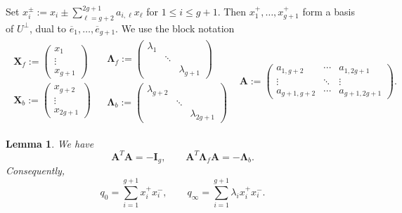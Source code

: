 \documentclass[12pt, letterpaper]{amsart}
\newtheorem{lemma}[theorem]{Lemma}
\theoremstyle{definition}
\newcommand{\bA}{\mathbf{A} }
\newcommand{\bI}{\mathbf{I} }
\newcommand{\bX}{\mathbf{X} }
\newcommand{\lbd}{\lambda}
\begin{document}
Set \(x_i^\pm:=x_i\pm\sum_{\ell=g+2}^{2g+1}a_{i,\ell}x_\ell\) for \(1\le i\le g+1\). Then \(x_1^+,\dots,x_{g+1}^+\) form a basis of \(U^\perp\), dual to \(\overline e_1,\dots,\overline e_{g+1}\). We use the block notation
\[
\begin{matrix}
  \begin{matrix}
  \bX_f:=\left(\begin{smallmatrix}
  x_1\\
  \vdots\\
  x_{g+1}
  \end{smallmatrix}\right) \\[6pt]
  \bX_b:=\left(\begin{smallmatrix}
  x_{g+2}\\
  \vdots\\
  x_{2g+1}
  \end{smallmatrix}\right)
  \end{matrix} & \begin{matrix}
  \mathbf\Lambda_f:=\left(\begin{smallmatrix}
  \lbd_1\\
  &\ddots\\
  &&\lbd_{g+1}
  \end{smallmatrix}\right) \\[6pt]
  \mathbf\Lambda_b:=\left(\begin{smallmatrix}
  \lbd_{g+2}\\
  &\ddots\\
  &&\lbd_{2g+1}
  \end{smallmatrix}\right)
  \end{matrix} & \bA:= \begin{pmatrix}
  a_{1,g+2}&\cdots&a_{1,2g+1}\\
  \vdots&\ddots&\vdots\\
  a_{g+1,g+2}&\cdots&a_{g+1,2g+1}
  \end{pmatrix}.
\end{matrix}
\]

\begin{lemma}\label{lem:split_quadrics}
We have
\begin{equation}\label{eqn:matrixidentity}
\bA^T\bA=-\bI_g, \qquad \bA^T\mathbf\Lambda_f\bA=-\mathbf\Lambda_b.
\end{equation}
Consequently,
\begin{equation}\label{q_split}
q_0=\sum_{i=1}^{g+1}x_i^+x_i^-, \qquad q_\infty=\sum_{i=1}^{g+1}\lbd_i x_i^+x_i^-.
\end{equation}
\end{lemma}
\end{document}
